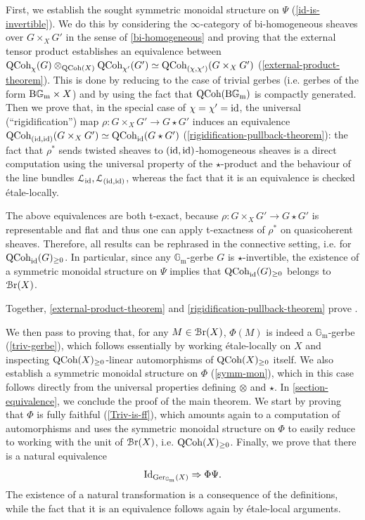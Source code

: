 \documentclass[11pt, twoside]{article} %
\numberwithin{equation}{section}
\theoremstyle{plain}
\theoremstyle{definition}
\newcommand{\Gm}{\mathbb G_{\mathrm{m}}}
\newcommand{\id}{\textup{id}}
\newcommand{\QCoh}{\textup{QCoh}}
\newcommand{\BGm}{\textup{B}\Gm}
\newcommand{\cL}{\mathcal L}
\newcommand{\cBr}{\mathcal{B}\textup{r}}
\newcommand{\Ger}{\textup{Ger}}
\begin{document}
 First, we establish the sought symmetric monoidal structure on $\Psi$ (\cref{id-is-invertible}). We do this by considering the $\infty$-category of bi-homogeneous sheaves over $G\times_X G'$ in the sense of \cref{bi-homogeneous} and proving that the external tensor product establishes an equivalence between $\QCoh_\chi(G)\otimes_{\QCoh(X)}\QCoh_{\chi'}(G')\simeq \QCoh_{(\chi,\chi')}(G\times_XG')$ (\cref{external-product-theorem}). This is done by reducing to the case of trivial gerbes (i.e. gerbes of the form $\BGm\times X$) and by using the fact that $\QCoh(\BGm)$ is compactly generated. Then we prove that, in the special case of $\chi=\chi'=\id$, the universal (``rigidification'') map $\rho:G\times_X G'\to G\star G'$ induces an equivalence $\QCoh_{(\id,\id)}(G\times_XG')\simeq \QCoh_\id(G\star G')$ (\cref{rigidification-pullback-theorem}): the fact that $\rho^*$ sends twisted sheaves to $(\id,\id)$-homogeneous sheaves is a direct computation using the universal property of the $\star$-product and the behaviour of the line bundles $\cL_\id, \cL_{(\id,\id)}$, whereas the fact that it is an equivalence is checked \'etale-locally.
 
The above equivalences are both t-exact, because $\rho:G \times_X G'\to G\star G'$ is representable and flat and thus one can apply t-exactness of $\rho^*$ on quasicoherent sheaves. Therefore, all results can be rephrased in the connective setting, i.e. for $\QCoh_\id(G)_{\geq 0}$.
In particular, since any $\Gm$-gerbe $G$ is $\star$-invertible, the existence of a symmetric monoidal structure on $\Psi$ implies that $\QCoh_\id(G)_{\geq 0}$ belongs to $\cBr(X)$.

Together, \cref{external-product-theorem} and \cref{rigidification-pullback-theorem} prove \cite[Conjecture 5.27]{BP}.

We then pass to proving that, for any $M\in \cBr(X)$, $\Phi(M)$ is indeed a $\Gm$-gerbe (\cref{triv-gerbe}), which follows essentially by working \'etale-locally on $X$ and inspecting $\QCoh(X)_{\geq 0}$-linear automorphisms of $\QCoh(X)_{\geq 0}$ itself. We also establish a symmetric monoidal structure on $\Phi$ (\cref{symm-mon}), which in this case follows directly from the universal properties defining $\otimes$ and $\star$.
In \cref{section-equivalence}, we conclude the proof of the main theorem. We start by proving that $\Phi$ is fully faithful (\cref{Triv-is-ff}), which amounts again to a computation of automorphisms and uses the symmetric monoidal structure on $\Phi$ to easily reduce to working with the unit of $\cBr(X)$, i.e. $\QCoh(X)_{\geq 0}$. Finally, we prove that there is a natural equivalence $$\textup{Id}_{\Ger_{\Gm}(X)}\Rightarrow \Phi\Psi.$$ The existence of a natural transformation is a consequence of the definitions, while the fact that it is an equivalence follows again by \'etale-local arguments.
	
\end{document}
